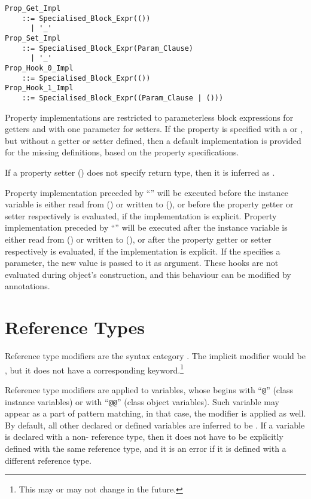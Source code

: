 \begin{lstlisting}[deletekeywords={with}]
Prop_Get_Impl 
    ::= Specialised_Block_Expr(())
      | '_'
Prop_Set_Impl 
    ::= Specialised_Block_Expr(Param_Clause)
      | '_'
Prop_Hook_0_Impl
    ::= Specialised_Block_Expr(())
Prop_Hook_1_Impl
    ::= Specialised_Block_Expr((Param_Clause | ()))
\end{lstlisting}

Property implementations are restricted to parameterless block expressions for getters and with one parameter for setters. If the property is specified with a  or , but without a getter or setter defined, then a default implementation is provided for the missing definitions, based on the property specifications. 

If a property setter () does not specify return type, then it is inferred as . 

Property implementation preceded by ``'' will be executed before the instance variable is either read from () or written to (), or before the property getter or setter respectively is evaluated, if the implementation is explicit. Property implementation preceded by ``'' will be executed after the instance variable is either read from () or written to (), or after the property getter or setter respectively is evaluated, if the implementation is explicit. If the  specifies a parameter, the new value is passed to it as argument. These hooks are not evaluated during object's construction, and this behaviour can be modified by annotations. 






\section{Reference Types}
\label{sec:ref-types}

Reference type modifiers are the syntax category . The implicit modifier would be , but it does not have a corresponding keyword.\footnote{This may or may not change in the future.} 

Reference type modifiers are applied to variables, whose  begins with ``\lstinline!@!'' (class instance variables) or with ``\lstinline!@@!'' (class object variables). Such variable may appear as a part of pattern matching, in that case, the modifier is applied as well. By default, all other declared or defined variables are inferred to be . If a variable is declared with a non- reference type, then it does not have to be explicitly defined with the same reference type, and it is an error if it is defined with a different reference type. 

